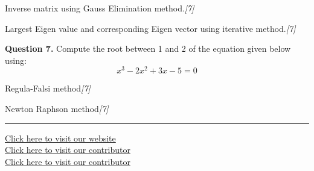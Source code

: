 \documentclass[11pt,a4paper]{article}
\newcommand{\pts}[1]{\hfill   \textit{[#1]}}
\begin{document}
\begin{parts}
  \item Inverse matrix using Gauss Elimination method.\pts{7}
  \item Largest Eigen value and corresponding Eigen vector using iterative method.\pts{7}
\end{parts}

\medskip


\noindent   \textbf{Question 7.} Compute the root between 1 and 2 of the equation given below using:
\[ x^3 - 2x^2 + 3x - 5 = 0 \]

\begin{parts}
  \item Regula-Falsi method\pts{7}
  \item Newton Raphson method\pts{7}
\end{parts}


\vfill
\rule{\linewidth}{0.4pt}

\begin{center}\small
\href{https://bhu-exam.vercel.app/}{Click here to visit our website}\\[4pt]\href{https://me-aryan.vercel.app/}{Click here to visit our contributor}\\[4pt]\href{https://quashan-me.vercel.app/}{Click here to visit our contributor}
\end{center}
\end{document}
